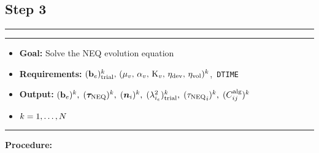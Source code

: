 \subsection*{Step 3}
\vspace{0.1cm}
\hrule
\vspace{0.1cm}
\hrule
\begin{itemize}
    \item \textbf{Goal:} Solve the NEQ evolution equation
    \item \textbf{Requirements:} \(({\mathbf{b}_{e}})_\text{trial}^{k},\, (\mu_{v},\, \alpha_{v},\, \mathrm{K}_{v},\, \eta_{\text{dev}},\, \eta_{\text{vol}})^k\),\, \texttt{DTIME} 
    \item \textbf{Output:} \(({\mathbf{b}_{e}})^{k},\; ({\bm{\tau}_{\text{NEQ}}})^{k},\; ({\bm{n}_{i}})^{k},\; ({\lambda^{2}_{{i}_e}})_\text{trial}^{k},\; ({{{\tau}_{\text{NEQ}}}_{i}})^{k},\; (C^{\text{alg}}_{ij})^{k}\)
    \item[] \(\hfill k=1,\ldots,N \)
\end{itemize}
\vspace{0.1cm}
\hrule
\textbf{Procedure:}

